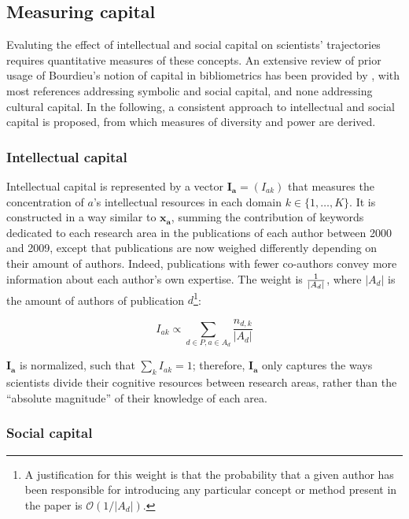 \documentclass{article}
\begin{document}
\subsection{\label{sec:capital}Measuring capital}

Evaluting the effect of intellectual and social capital on scientists' trajectories requires quantitative measures of these concepts. An extensive review of prior usage of Bourdieu's notion of capital in bibliometrics has been provided by \citet[p.~198-200]{Schirone2023}, with most references addressing symbolic and social capital, and none addressing cultural capital. In the following, a consistent approach to intellectual and social capital is proposed, from which measures of diversity and power are derived.

\subsubsection{Intellectual capital}

Intellectual capital is represented by a vector $\bm{I_a}=(I_{ak})$ that measures the concentration of $a$'s intellectual resources in each domain $k \in \{1,\dots,K\}$. It is constructed in a way similar to $\bm{x_{a}}$, summing the contribution of keywords dedicated to each research area in the publications of each author between 2000 and 2009, except that publications are now weighed differently depending on their amount of authors. Indeed, publications with fewer co-authors convey more information about each author's own expertise. The weight is $1 \over |A_d|$, where $|A_d|$ is the amount of authors of publication $d$\footnote{A justification for this weight is that the probability that a given author has been responsible for introducing any particular concept or method present in the paper is $\mathcal{O}(1/|A_d|)$. }:

\begin{equation}
    I_{ak} \propto  \sum_{d\in P,a\in A_d} \dfrac{n_{d,k}}{|A_d|}
\end{equation}

$\bm{I_a}$ is normalized, such that $\sum_k I_{ak}=1$; therefore, $\bm{I_a}$ only captures the ways scientists divide their cognitive resources between research areas, rather than the ``absolute magnitude'' of their knowledge of each area.  

\subsubsection{Social capital}
\end{document}
